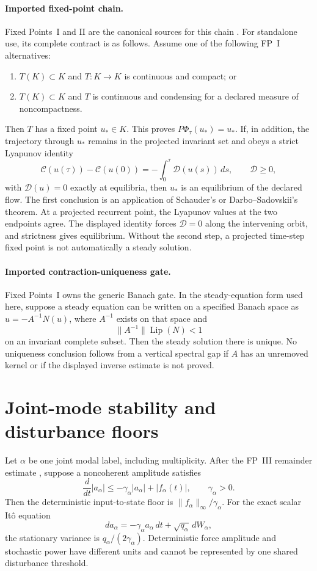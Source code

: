 \documentclass[11pt]{article}
\begin{document}
\paragraph{Imported fixed-point chain.}
Fixed Points~I and II are the canonical sources for this chain
\cite{FPI,FPII}. For standalone use, its complete contract is as follows.
Assume one of the following FP~I alternatives:
\begin{enumerate}
\item $T(K)\subset K$ and $T:K\to K$ is continuous and compact; or
\item $T(K)\subset K$ and $T$ is continuous and condensing for a declared
measure of noncompactness.
\end{enumerate}
Then $T$ has a fixed point $u_\ast\in K$. This proves
$P\Phi_\tau(u_\ast)=u_\ast$. If, in addition, the trajectory through
$u_\ast$ remains in the projected invariant set and obeys a strict Lyapunov
identity
\[
 \mathcal C(u(\tau))-\mathcal C(u(0))
 =-\int_0^\tau\mathcal D(u(s))\,ds,
 \qquad \mathcal D\ge0,
\]
with $\mathcal D(u)=0$ exactly at equilibria, then $u_\ast$ is an equilibrium
of the declared flow.
The first conclusion is an application of Schauder's or Darbo--Sadovskii's
theorem. At a
projected recurrent point, the Lyapunov values at the two endpoints agree.
The displayed identity forces $\mathcal D=0$ along the intervening orbit, and
strictness gives equilibrium. Without the second step, a projected time-step
fixed point is not automatically a steady solution.

\paragraph{Imported contraction-uniqueness gate.}
Fixed Points~I owns the generic Banach gate. In the steady-equation form used
here, suppose a steady equation can be written on a specified Banach space as
$u=-A^{-1}N(u)$, where $A^{-1}$ exists on that space and
\[
 \|A^{-1}\|\operatorname{Lip}(N)<1
\]
on an invariant complete subset. Then the steady solution there is unique.
No uniqueness conclusion follows from a vertical spectral gap if $A$ has an
unremoved kernel or if the displayed inverse estimate is not proved.

\section{Joint-mode stability and disturbance floors}

Let $\alpha$ be one joint modal label, including multiplicity. After the
FP~III remainder estimate \cite{FPIII}, suppose a noncoherent amplitude satisfies
\[
 \frac{d}{dt}|a_\alpha|
 \le-\gamma_\alpha|a_\alpha|+|f_\alpha(t)|,
 \qquad \gamma_\alpha>0.
\]
Then the deterministic input-to-state floor is
$\|f_\alpha\|_\infty/\gamma_\alpha$. For the exact scalar It\^o equation
\[
 da_\alpha=-\gamma_\alpha a_\alpha\,dt
 +\sqrt{q_\alpha}\,dW_\alpha,
\]
the stationary variance is $q_\alpha/(2\gamma_\alpha)$. Deterministic force
amplitude and stochastic power have different units and cannot be represented
by one shared disturbance threshold.
\end{document}
